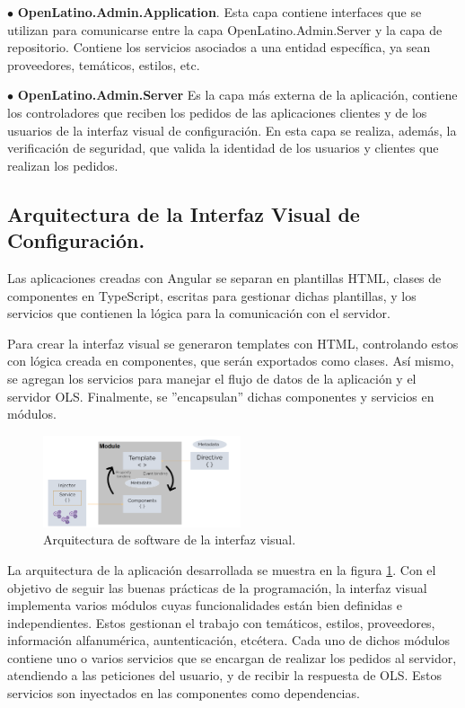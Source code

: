 $\bullet$ \textbf{OpenLatino.Admin.Application}. Esta capa contiene interfaces que se utilizan para comunicarse entre la capa OpenLatino.Admin.Server y la capa de repositorio. Contiene los servicios asociados a una entidad espec\'ifica, ya sean proveedores, tem\'aticos, estilos, etc.

$\bullet$ \textbf{OpenLatino.Admin.Server} Es la capa m\'as externa de la aplicaci\'on, contiene los controladores que reciben los pedidos de las aplicaciones clientes y de los usuarios de la interfaz visual de configuraci\'on. En esta capa se realiza, adem\'as, la verificaci\'on de seguridad, que valida la identidad de los usuarios y clientes que realizan los pedidos.


\subsection{Arquitectura de la Interfaz Visual de Configuraci\'on.}
Las aplicaciones creadas con Angular se separan en plantillas HTML, clases de componentes en TypeScript, escritas para gestionar dichas plantillas, y los servicios que contienen la l\'ogica para la comunicaci\'on con el servidor. 

Para crear la interfaz visual se generaron templates con HTML, controlando estos con l\'ogica creada en componentes, que ser\'an exportados como clases. As\'i mismo, se agregan los servicios para manejar el flujo de datos de la aplicaci\'on y el servidor OLS. Finalmente, se ''encapsulan'' dichas componentes y servicios en m\'odulos. 

\begin{figure}
\vspace{-20pt}
\begin{center}
\includegraphics[width=0.52\textwidth]{images/angularArchitecture.png} 
\end{center} \vspace{-20pt} \caption{Arquitectura de software de la interfaz visual.}  \label{arquitecturaAngular} \vspace{-10pt} 
\end{figure}

La arquitectura de la aplicaci\'on desarrollada se muestra en la figura \ref{arquitecturaAngular}. Con el objetivo de seguir las buenas pr\'acticas de la programaci\'on, la interfaz visual implementa varios m\'odulos cuyas funcionalidades est\'an bien definidas e independientes. Estos gestionan el trabajo con tem\'aticos, estilos, proveedores, informaci\'on alfanum\'erica, auntenticaci\'on, etc\'etera. Cada uno de dichos m\'odulos contiene uno o varios servicios que se encargan de realizar los pedidos al servidor, atendiendo a las peticiones del usuario, y de recibir la respuesta de OLS. Estos servicios son inyectados en las componentes como dependencias.

